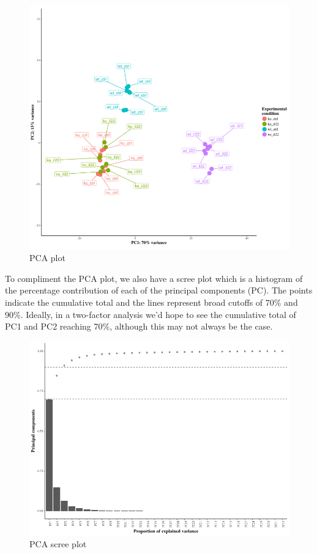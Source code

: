 \documentclass[11pt]{article}
\makeatletter
\def\maxwidth{\ifdim\Gin@nat@width>\linewidth\linewidth
    \else\Gin@nat@width\fi}
\let\Oldincludegraphics\includegraphics
\renewcommand{\includegraphics}[1]{\Oldincludegraphics[width=.8\maxwidth, height=.55\textheight, keepaspectratio]{#1}}
\makeatother
\begin{document}
    \begin{figure}[H]
\centering
\includegraphics{images/pca.png}
\caption{PCA plot}
\end{figure}

    To compliment the PCA plot, we also have a scree plot which is a
histogram of the percentage contribution of each of the principal
components (PC). The points indicate the cumulative total and the lines
represent broad cutoffs of 70\% and 90\%. Ideally, in a two-factor
analysis we'd hope to see the cumulative total of PC1 and PC2 reaching
70\%, although this may not always be the case.

    \begin{figure}[H]
\centering
\includegraphics{images/pca_scree.png}
\caption{PCA scree plot}
\end{figure}
\end{document}
